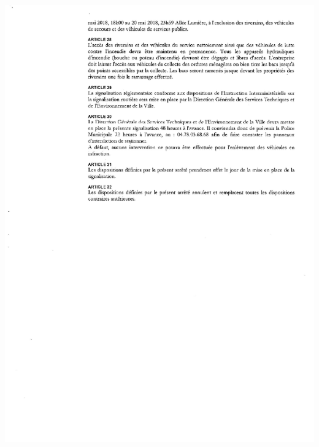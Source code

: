 \documentclass[hidelinks, paper=a4, fontsize=13pt]{report}
\begin{document}
\begin{center}
\includegraphics[scale = 0.7]{Annexes/Documents/VilleurbanneCirculation4}

\end{center}
\end{document}
